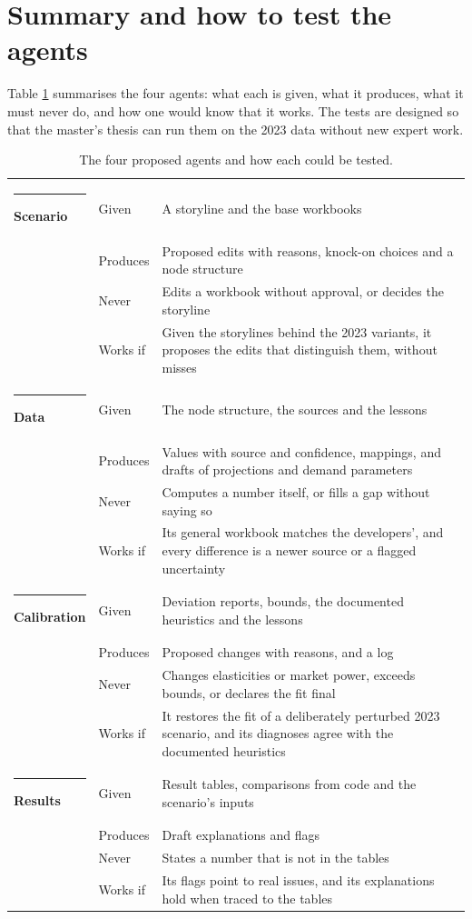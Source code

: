 \section{Summary and how to test the agents}

Table \ref{tab:agents} summarises the four agents: what each is given, what it produces, what it must never do, and how one would know that it works.
The tests are designed so that the master's thesis can run them on the 2023 data without new expert work.

\begin{table}[htbp]
\centering
\small
\caption{The four proposed agents and how each could be tested.}
\label{tab:agents}
\newcommand{\agent}[1]{\textcolor{ggmAgent}{\rule{1.8mm}{1.8mm}}\enspace\textbf{#1}}
\newcommand{\fld}[1]{\textcolor{ggmMuted}{#1}}
\setlength{\tabcolsep}{6pt}
\begin{tabularx}{\textwidth}{@{}>{\raggedright\arraybackslash}p{2.5cm}>{\raggedright\arraybackslash}p{1.45cm}>{\raggedright\arraybackslash}X@{}}
\toprule
\agent{Scenario} & \fld{Given} & A storyline and the base workbooks \\
 & \fld{Produces} & Proposed edits with reasons, knock-on choices and a node structure \\
 & \fld{Never} & Edits a workbook without approval, or decides the storyline \\
 & \fld{Works if} & Given the storylines behind the 2023 variants, it proposes the edits that distinguish them, without misses \\
\tabsep
\agent{Data} & \fld{Given} & The node structure, the sources and the lessons \\
 & \fld{Produces} & Values with source and confidence, mappings, and drafts of projections and demand parameters \\
 & \fld{Never} & Computes a number itself, or fills a gap without saying so \\
 & \fld{Works if} & Its general workbook matches the developers', and every difference is a newer source or a flagged uncertainty \\
\tabsep
\agent{Calibration} & \fld{Given} & Deviation reports, bounds, the documented heuristics and the lessons \\
 & \fld{Produces} & Proposed changes with reasons, and a log \\
 & \fld{Never} & Changes elasticities or market power, exceeds bounds, or declares the fit final \\
 & \fld{Works if} & It restores the fit of a deliberately perturbed 2023 scenario, and its diagnoses agree with the documented heuristics \\
\tabsep
\agent{Results} & \fld{Given} & Result tables, comparisons from code and the scenario's inputs \\
 & \fld{Produces} & Draft explanations and flags \\
 & \fld{Never} & States a number that is not in the tables \\
 & \fld{Works if} & Its flags point to real issues, and its explanations hold when traced to the tables \\
\bottomrule
\end{tabularx}
\end{table}

